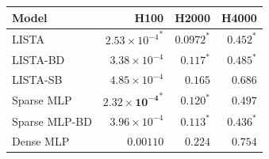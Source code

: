 \begin{tabular}{@{}l r r r@{}}
\toprule
Model & H100 & H2000 & H4000 \\
\midrule
LISTA & ${2.53{\times}10^{-4}}^{\ast}$ & ${\mathbf{0.0972}}^{\ast}$ & ${0.452}^{\ast}$ \\
LISTA-BD & $3.38{\times}10^{-4}$ & ${0.117}^{\ast}$ & ${0.485}^{\ast}$ \\
LISTA-SB & $4.85{\times}10^{-4}$ & $0.165$ & $0.686$ \\
Sparse MLP & ${\mathbf{2.32{\times}10^{-4}}}^{\ast}$ & ${0.120}^{\ast}$ & $0.497$ \\
Sparse MLP-BD & $3.96{\times}10^{-4}$ & ${0.113}^{\ast}$ & ${\mathbf{0.436}}^{\ast}$ \\
Dense MLP & $0.00110$ & $0.224$ & $0.754$ \\
\bottomrule
\end{tabular}
